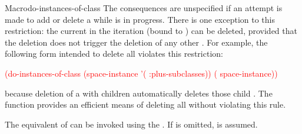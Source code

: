 \documentclass[10pt,twoside,english,pdftex]{article}
\begin{document}
\begin{functiondoc}{Macro}{do-instances-of-class}
\fnnote {}%
%
%
The consequences are unspecified if an attempt is made to add or delete a
 while  is in
progress.  There is one exception to this restriction: the current
 in the iteration (bound to ) can be deleted,
provided that the deletion does not trigger the deletion of any other
.  For example, the following form intended to delete
all  violates this restriction:
%
\W\supp
\begin{example}
   \textcolor{red}{(do-instances-of-class (space-instance 
                             '( :plus-subclasses))
     ( space-instance))}
\end{example}
%
because deletion of a  with children automatically
deletes those child .  The function
 provides an efficient
means of deleting all  without violating this rule.

\replnote 
%
%
%
The equivalent of 
can be invoked using the  .
If  is omitted,  is assumed.

\end{functiondoc}

\end{document}
